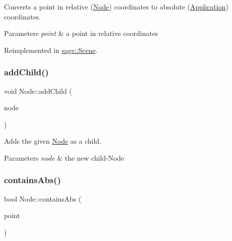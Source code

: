 Converts a point in relative (\mbox{\hyperlink{classsage_1_1Node}{Node}}) coordinates to absolute (\mbox{\hyperlink{classsage_1_1Application}{Application}}) coordinates. 


\begin{DoxyParams}{Parameters}
{\em point} & a point in relative coordinates \\
\hline
\end{DoxyParams}


Reimplemented in \mbox{\hyperlink{classsage_1_1Scene_a7d445c207e9b3d978c8a47ceacd10b24}{sage\+::\+Scene}}.

\mbox{\label{classsage_1_1Node_a248ad6b9a12f2a7608e6c2ed167d0c5e}} 
\subsubsection{\texorpdfstring{addChild()}{addChild()}}
{\footnotesize\ttfamily void Node\+::add\+Child (\begin{DoxyParamCaption}\item[{std\+::shared\+\_\+ptr$<$ \mbox{\hyperlink{classsage_1_1Node}{Node}} $>$}]{node }\end{DoxyParamCaption})}



Adds the given \mbox{\hyperlink{classsage_1_1Node}{Node}} as a child. 


\begin{DoxyParams}{Parameters}
{\em node} & the new child-\/\+Node \\
\hline
\end{DoxyParams}
\mbox{\label{classsage_1_1Node_a3c1dc218e31de4929367c6bd149cc399}} 
\subsubsection{\texorpdfstring{containsAbs()}{containsAbs()}\hspace{0.1cm}{\footnotesize\ttfamily [1/2]}}
{\footnotesize\ttfamily bool Node\+::contains\+Abs (\begin{DoxyParamCaption}\item[{glm\+::vec3}]{point }\end{DoxyParamCaption})}



